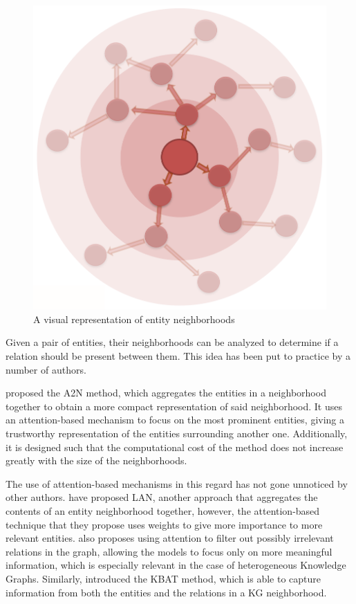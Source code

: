 \begin{figure}[!htp]
    \centering
    \includegraphics[width=.7\textwidth]{fig/paths/neighborhoods-b.png}
    \caption{A visual representation of entity neighborhoods}
    \label{fig:path-neighborhood}
\end{figure}


Given a pair of entities, their neighborhoods can be analyzed to determine if a relation should be present between them. This idea has been put to practice by a number of authors.

\citet{bansal2019a2n} proposed the A2N method, which aggregates the entities in a neighborhood together to obtain a more compact representation of said neighborhood. It uses an attention-based mechanism to focus on the most prominent entities, giving a trustworthy representation of the entities surrounding another one. Additionally, it is designed such that the computational cost of the method does not increase greatly with the size of the neighborhoods.

The use of attention-based mechanisms in this regard has not gone unnoticed by other authors. \citet{wang2019} have proposed LAN, another approach that aggregates the contents of an entity neighborhood together, however, the attention-based technique that they propose uses weights to give more importance to more relevant entities. \citet{kong2019} also proposes using attention to filter out possibly irrelevant relations in the graph, allowing the models to focus only on more meaningful information, which is especially relevant in the case of heterogeneous Knowledge Graphs. Similarly, \citet{nathani2019} introduced the KBAT method, which is able to capture information from both the entities and the relations in a KG neighborhood. 

